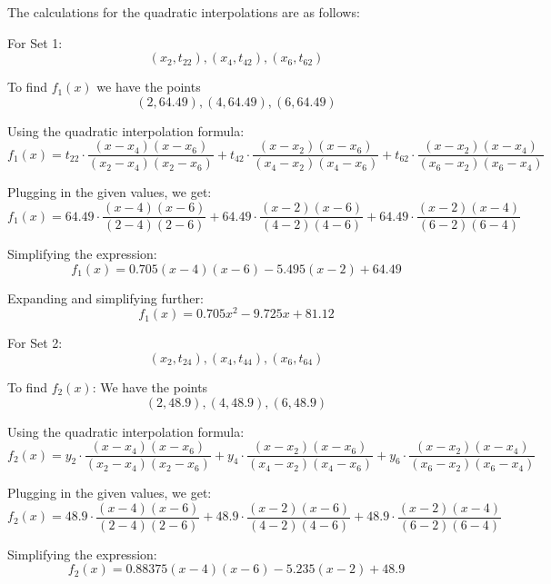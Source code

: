 \documentclass[12pt, a4paper]{article}
\numberwithin{equation}{section}
\begin{document}
The calculations for the quadratic interpolations are as follows:

For Set 1: 
$$(x_2, t_{22}), (x_4, t_{42}), (x_6, t_{62})$$

To find $f_1(x)$ we have the points 
$$(2, 64.49), (4, 64.49), (6, 64.49)$$

Using the quadratic interpolation formula:
\begin{equation}
    f_1(x) = t_{22} \cdot \frac{(x-x_4)(x-x_6)}{(x_2-x_4)(x_2-x_6)} + t_{42} \cdot \frac{(x-x_2)(x-x_6)}{(x_4-x_2)(x_4-x_6)} + t_{62} \cdot \frac{(x-x_2)(x-x_4)}{(x_6-x_2)(x_6-x_4)}
\end{equation}

Plugging in the given values, we get:
\begin{equation}
    f_1(x) = 64.49 \cdot \frac{(x-4)(x-6)}{(2-4)(2-6)} + 64.49 \cdot \frac{(x-2)(x-6)}{(4-2)(4-6)} + 64.49 \cdot \frac{(x-2)(x-4)}{(6-2)(6-4)}
\end{equation}

Simplifying the expression:
\begin{equation}
    f_1(x) = 0.705 (x-4)(x-6) - 5.495(x-2) + 64.49
\end{equation}

Expanding and simplifying further:
\begin{equation}
    f_1(x) = 0.705x^2 - 9.725x + 81.12
\end{equation}

For Set 2: 
$$(x_2, t_{24}), (x_4, t_{44}), (x_6, t_{64})$$

To find $f_2(x)$:
We have the points 
$$(2, 48.9), (4, 48.9), (6, 48.9)$$

Using the quadratic interpolation formula:
\begin{equation}
    f_2(x) = y_2 \cdot \frac{(x-x_4)(x-x_6)}{(x_2-x_4)(x_2-x_6)} + y_4 \cdot \frac{(x-x_2)(x-x_6)}{(x_4-x_2)(x_4-x_6)} + y_6 \cdot \frac{(x-x_2)(x-x_4)}{(x_6-x_2)(x_6-x_4)}
\end{equation}

Plugging in the given values, we get:
\begin{equation}
    f_2(x) = 48.9 \cdot \frac{(x-4)(x-6)}{(2-4)(2-6)} + 48.9 \cdot \frac{(x-2)(x-6)}{(4-2)(4-6)} + 48.9 \cdot \frac{(x-2)(x-4)}{(6-2)(6-4)}
\end{equation}


Simplifying the expression:
\begin{equation}
    f_2(x) = 0.88375 (x-4)(x-6) - 5.235(x-2) + 48.9
\end{equation}
\end{document}

